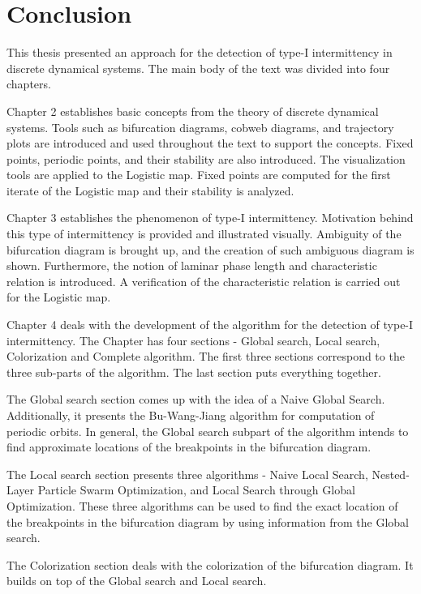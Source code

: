 \chapter{Conclusion}

This thesis presented an approach for the detection of type-I intermittency in discrete dynamical systems.
The main body of the text was divided into four chapters.
\par
Chapter 2 establishes basic concepts from the theory of discrete dynamical systems.
Tools such as bifurcation diagrams, cobweb diagrams, and trajectory plots are introduced and used throughout the text to support the concepts.
Fixed points, periodic points, and their stability are also introduced.
The visualization tools are applied to the Logistic map.
Fixed points are computed for the first iterate of the Logistic map and their stability is analyzed.
\par
Chapter 3 establishes the phenomenon of type-I intermittency.
Motivation behind this type of intermittency is provided and illustrated visually.
Ambiguity of the bifurcation diagram is brought up, and the creation of such ambiguous diagram is shown.
Furthermore, the notion of laminar phase length and characteristic relation is introduced.
A verification of the characteristic relation is carried out for the Logistic map.
\par
Chapter 4 deals with the development of the algorithm for the detection of type-I intermittency.
The Chapter has four sections - Global search, Local search, Colorization and Complete algorithm.
The first three sections correspond to the three sub-parts of the algorithm.
The last section puts everything together.
\par
The Global search section comes up with the idea of a Naive Global Search.
Additionally, it presents the Bu-Wang-Jiang algorithm for computation of periodic orbits.
In general, the Global search subpart of the algorithm intends to find approximate locations of the breakpoints in the bifurcation diagram.
\par
The Local search section presents three algorithms - Naive Local Search, Nested-Layer Particle Swarm Optimization, and Local Search through Global Optimization.
These three algorithms can be used to find the exact location of the breakpoints in the bifurcation diagram by using information from the Global search.
\par
The Colorization section deals with the colorization of the bifurcation diagram.
It builds on top of the Global search and Local search.
